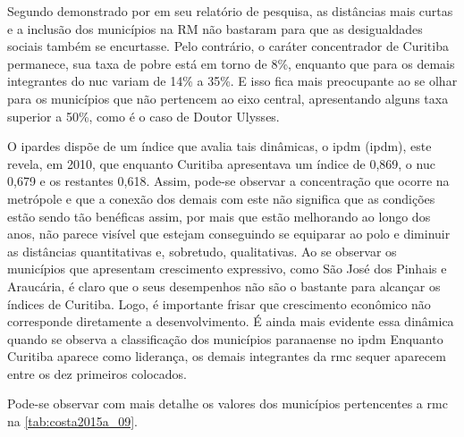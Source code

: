 	Segundo demonstrado por  em seu relatório de pesquisa, as distâncias mais curtas e a inclusão dos municípios na RM não bastaram para que as desigualdades sociais também se encurtasse. Pelo contrário, o caráter concentrador de Curitiba permanece, sua taxa de pobre está em torno de 8\%, enquanto que para os demais integrantes do \gls{nuc} variam de 14\% a 35\%. E isso fica mais preocupante ao se olhar para os municípios que não pertencem ao eixo central, apresentando alguns taxa superior a 50\%, como é o caso de Doutor Ulysses. 
	
	O \gls{ipardes} dispõe de um índice que avalia tais dinâmicas, o \gls{ipdm} (\glsdesc{ipdm}), este revela, em 2010, que enquanto Curitiba apresentava um índice de 0,869, o \gls{nuc} 0,679 e os restantes 0,618. Assim, pode-se observar a concentração que ocorre na metrópole e que a conexão dos demais com este não significa que as condições estão sendo tão benéficas assim, por mais que estão melhorando ao longo dos anos, não parece visível que estejam conseguindo se equiparar ao polo e diminuir as distâncias quantitativas e, sobretudo, qualitativas. Ao se observar os municípios que apresentam crescimento expressivo, como São José dos Pinhais e Araucária, é claro que o seus desempenhos não são o bastante para alcançar os índices de Curitiba. Logo, é importante frisar que crescimento econômico não corresponde diretamente a desenvolvimento. É ainda mais evidente essa dinâmica quando se observa a classificação dos municípios paranaense no \gls{ipdm} Enquanto Curitiba aparece como liderança, os demais integrantes da \gls{rmc} sequer aparecem entre os dez primeiros colocados.
	
	Pode-se observar com mais detalhe os valores dos municípios pertencentes a \gls{rmc} na \autoref{tab:costa2015a_09}.
		
